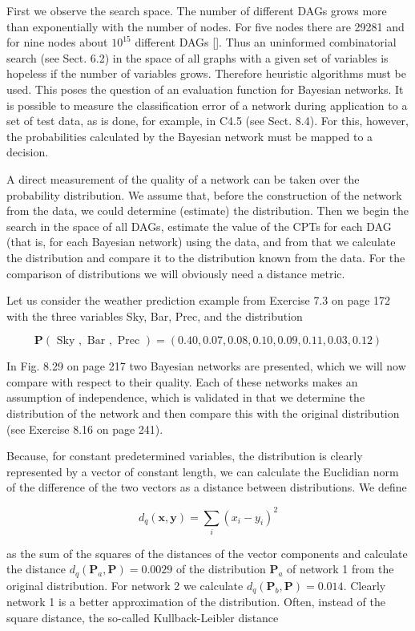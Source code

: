 \documentclass[10pt]{book}
\begin{document}
First we observe the search space. The number of different DAGs grows more than exponentially with the number of nodes. For five nodes there are 29281 and for nine nodes about $10^{15}$ different DAGs [\cite{melancon2000dags}]. Thus an uninformed combinatorial search (see Sect. 6.2) in the space of all graphs with a given set of variables is hopeless if the number of variables grows. Therefore heuristic algorithms must be used. This poses the question of an evaluation function for Bayesian networks. It is possible to measure the classification error of a network during application to a set of test data, as is done, for example, in C4.5 (see Sect. 8.4). For this, however, the probabilities calculated by the Bayesian network must be mapped to a decision.

A direct measurement of the quality of a network can be taken over the probability distribution. We assume that, before the construction of the network from the data, we could determine (estimate) the distribution. Then we begin the search in the space of all DAGs, estimate the value of the CPTs for each DAG (that is, for each Bayesian network) using the data, and from that we calculate the distribution and compare it to the distribution known from the data. For the comparison of distributions we will obviously need a distance metric.

Let us consider the weather prediction example from Exercise 7.3 on page 172 with the three variables Sky, Bar, Prec, and the distribution

$$
\boldsymbol{P}(\text { Sky }, \text { Bar }, \text { Prec })=(0.40,0.07,0.08,0.10,0.09,0.11,0.03,0.12)
$$

In Fig. 8.29 on page 217 two Bayesian networks are presented, which we will now compare with respect to their quality. Each of these networks makes an assumption of independence, which is validated in that we determine the distribution of the network and then compare this with the original distribution (see Exercise 8.16 on page 241).

Because, for constant predetermined variables, the distribution is clearly represented by a vector of constant length, we can calculate the Euclidian norm of the difference of the two vectors as a distance between distributions. We define

$$
d_{q}(\boldsymbol{x}, \boldsymbol{y})=\sum_{i}\left(x_{i}-y_{i}\right)^{2}
$$

as the sum of the squares of the distances of the vector components and calculate the distance $d_{q}\left(\boldsymbol{P}_{a}, \boldsymbol{P}\right)=0.0029$ of the distribution $\boldsymbol{P}_{a}$ of network 1 from the original distribution. For network 2 we calculate $d_{q}\left(\boldsymbol{P}_{b}, \boldsymbol{P}\right)=0.014$. Clearly network 1 is a better approximation of the distribution. Often, instead of the square distance, the so-called Kullback-Leibler distance
\end{document}
